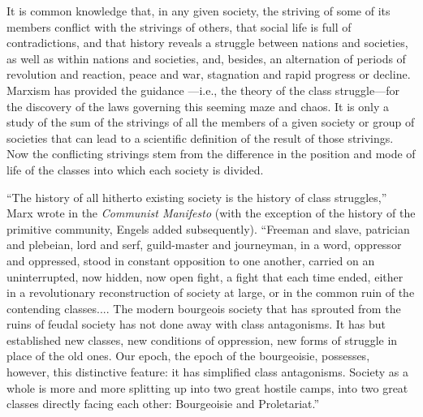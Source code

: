 \documentclass[a4paper,12pt]{book}
\begin{document}
It is common knowledge that, in any given society, the striving of some of its members conflict with the strivings of others, that social life is full of contradictions, and that history reveals a struggle between nations and societies, as well as within nations and societies, and, besides, an alternation of periods of revolution and reaction, peace and war, stagnation and rapid progress or decline. Marxism has provided the guidance —i.e., the theory of the class struggle—for the discovery of the laws governing this seeming maze and chaos. It is only a study of the sum of the strivings of all the members of a given society or group of societies that can lead to a scientific definition of the result of those strivings. Now the conflicting strivings stem from the difference in the position and mode of life of the classes into which each society is divided.

“The history of all hitherto existing society is the history of class struggles,” Marx wrote in the \emph{Communist Manifesto} (with the exception of the history of the primitive community, Engels added subsequently). “Freeman and slave, patrician and plebeian, lord and serf, guild-master and journeyman, in a word, oppressor and oppressed, stood in constant opposition to one another, carried on an uninterrupted, now hidden, now open fight, a fight that each time ended, either in a revolutionary reconstruction of society at large, or in the common ruin of the contending classes.... The modern bourgeois society that has sprouted from the ruins of feudal society has not done away with class antagonisms. It has but established new classes, new conditions of oppression, new forms of struggle in place of the old ones. Our epoch, the epoch of the bourgeoisie, possesses, however, this distinctive feature: it has simplified class antagonisms. Society as a whole is more and more splitting up into two great hostile camps, into two great classes directly facing each other: Bourgeoisie and Proletariat.”
\end{document}
